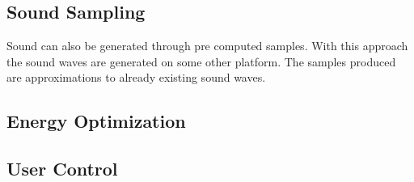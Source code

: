 



\subsection{Sound Sampling}
Sound can also be generated through pre computed samples. With this approach the sound waves are generated on some other platform. The samples produced are approximations to already existing sound waves. 


\subsection{Energy Optimization}





\subsection{User Control}













